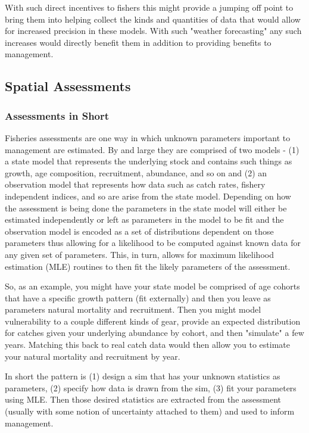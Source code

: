 \documentclass[11pt]{article}
\begin{document}
With such direct incentives to fishers this might provide a jumping off point to bring them into helping collect the kinds and quantities of data that would allow for increased precision in these models. With such "weather forecasting" any such increases would directly benefit them in addition to providing benefits to management. 

\newpage


\subsection{Spatial Assessments}

\subsubsection{Assessments in Short}

Fisheries assessments are one way in which unknown parameters important to management are estimated. By and large they are comprised of two models - (1) a state model that represents the underlying stock and contains such things as growth, age composition, recruitment, abundance, and so on and (2) an observation model that represents how data such as catch rates, fishery independent indices, and so are arise from the state model. Depending on how the assessment is being done the parameters in the state model will either be estimated independently or left as parameters in the model to be fit and the observation model is encoded as a set of distributions dependent on those parameters thus allowing for a likelihood to be computed against known data for any given set of parameters. This, in turn, allows for maximum likelihood estimation (MLE) routines to then fit the likely parameters of the assessment. \newline

So, as an example, you might have your state model be comprised of age cohorts that have a specific growth pattern (fit externally) and then you leave as parameters natural mortality and recruitment. Then you might model vulnerability to a couple different kinds of gear, provide an expected distribution for catches given your underlying abundance by cohort, and then "simulate" a few years. Matching this back to real catch data would then allow you to estimate your natural mortality and recruitment by year. \newline

In short the pattern is (1) design a sim that has your unknown statistics as parameters, (2) specify how data is drawn from the sim, (3) fit your parameters using MLE. Then those desired statistics are extracted from the assessment (usually with some notion of uncertainty attached to them) and used to inform management. 
\end{document}
